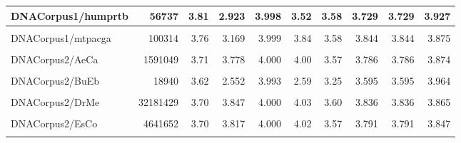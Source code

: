 \documentclass[12pt,twoside]{reedthesis}
\begin{document}
\begin{table}[!h]
{\begin{tabular}[t]{l|r|r|r|r|r|r|r|r|r}
\hline
DNACorpus1/humprtb & 56737 & 3.81 & 2.923 & 3.998 & 3.52 & 3.58 & 3.729 & 3.729 & 3.927\\
\hline
\cellcolor{gray!6}{DNACorpus1/mpomtcg} & \cellcolor{gray!6}{186609} & \cellcolor{gray!6}{3.68} & \cellcolor{gray!6}{3.218} & \cellcolor{gray!6}{3.999} & \cellcolor{gray!6}{3.84} & \cellcolor{gray!6}{3.50} & \cellcolor{gray!6}{3.682} & \cellcolor{gray!6}{3.682} & \cellcolor{gray!6}{3.896}\\
\hline
DNACorpus1/mtpacga & 100314 & 3.76 & 3.169 & 3.999 & 3.84 & 3.58 & 3.844 & 3.844 & 3.875\\
\hline
\cellcolor{gray!6}{DNACorpus1/vaccg} & \cellcolor{gray!6}{191737} & \cellcolor{gray!6}{3.81} & \cellcolor{gray!6}{3.315} & \cellcolor{gray!6}{3.999} & \cellcolor{gray!6}{3.94} & \cellcolor{gray!6}{3.65} & \cellcolor{gray!6}{3.794} & \cellcolor{gray!6}{3.794} & \cellcolor{gray!6}{3.874}\\
\hline
DNACorpus2/AeCa & 1591049 & 3.71 & 3.778 & 4.000 & 4.00 & 3.57 & 3.786 & 3.786 & 3.874\\
\hline
\cellcolor{gray!6}{DNACorpus2/AgPh} & \cellcolor{gray!6}{43970} & \cellcolor{gray!6}{3.64} & \cellcolor{gray!6}{2.807} & \cellcolor{gray!6}{3.997} & \cellcolor{gray!6}{3.28} & \cellcolor{gray!6}{3.36} & \cellcolor{gray!6}{3.653} & \cellcolor{gray!6}{3.653} & \cellcolor{gray!6}{3.957}\\
\hline
DNACorpus2/BuEb & 18940 & 3.62 & 2.552 & 3.993 & 2.59 & 3.25 & 3.595 & 3.595 & 3.964\\
\hline
\cellcolor{gray!6}{DNACorpus2/DaRe} & \cellcolor{gray!6}{62565020} & \cellcolor{gray!6}{3.88} & \cellcolor{gray!6}{3.928} & \cellcolor{gray!6}{4.000} & \cellcolor{gray!6}{4.39} & \cellcolor{gray!6}{3.76} & \cellcolor{gray!6}{4.013} & \cellcolor{gray!6}{4.013} & \cellcolor{gray!6}{4.035}\\
\hline
DNACorpus2/DrMe & 32181429 & 3.70 & 3.847 & 4.000 & 4.03 & 3.60 & 3.836 & 3.836 & 3.865\\
\hline
\cellcolor{gray!6}{DNACorpus2/EnIn} & \cellcolor{gray!6}{26403087} & \cellcolor{gray!6}{3.72} & \cellcolor{gray!6}{3.918} & \cellcolor{gray!6}{4.000} & \cellcolor{gray!6}{4.14} & \cellcolor{gray!6}{3.61} & \cellcolor{gray!6}{3.893} & \cellcolor{gray!6}{3.893} & \cellcolor{gray!6}{3.928}\\
\hline
DNACorpus2/EsCo & 4641652 & 3.70 & 3.817 & 4.000 & 4.02 & 3.57 & 3.791 & 3.791 & 3.847\\
\hline
\cellcolor{gray!6}{DNACorpus2/GaGa} & \cellcolor{gray!6}{148532294} & \cellcolor{gray!6}{3.74} & \cellcolor{gray!6}{3.776} & \cellcolor{gray!6}{4.000} & \cellcolor{gray!6}{4.15} & \cellcolor{gray!6}{3.65} & \cellcolor{gray!6}{3.943} & \cellcolor{gray!6}{3.943} & \cellcolor{gray!6}{3.897}\\

\end{tabular}}
\end{table}
\end{document}
